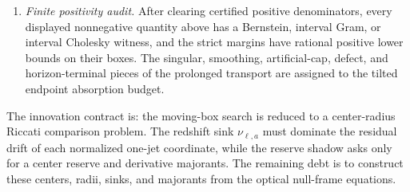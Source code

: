 \begin{definition}
\begin{enumerate}
    \item \emph{Finite positivity audit.}  After clearing certified positive
    denominators, every displayed nonnegative quantity above has a Bernstein,
    interval Gram, or interval Cholesky witness, and the strict margins have
    rational positive lower bounds on their boxes.  The singular, smoothing,
    artificial-cap, defect, and horizon-terminal pieces of the prolonged
    transport are assigned to the tilted endpoint absorption budget.
\end{enumerate}
The innovation contract is: the moving-box search is reduced to a
center-radius Riccati comparison problem.  The redshift sink
$\nu_{\ell,a}$ must dominate the residual drift of each normalized one-jet
coordinate, while the reserve shadow asks only for a center reserve and
derivative majorants.  The remaining debt is to construct these centers,
radii, sinks, and majorants from the optical null-frame equations.
\end{definition}

